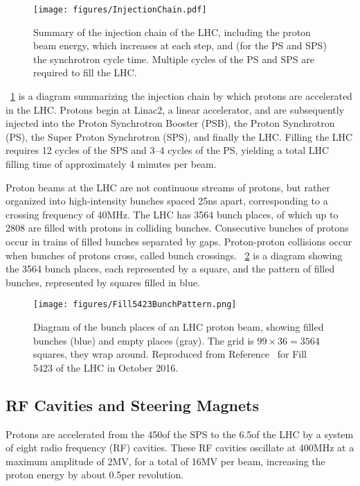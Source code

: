 \begin{figure}[tpb]
  \centering
  \texttt{[image: figures/InjectionChain.pdf]}
  \caption{Summary of the injection chain of the LHC, including the proton beam energy, which increases at each step, and (for the PS and SPS) the synchrotron cycle time. Multiple cycles of the PS and SPS are required to fill the LHC.}
  \label{cms:injectionchain}
\end{figure}

\Fig~\ref{cms:injectionchain} is a diagram summarizing the injection chain by which protons are accelerated in the LHC.
Protons begin at Linac2, a linear accelerator, and are subsequently injected into the Proton Synchrotron Booster (PSB), the Proton Synchrotron (PS), the Super Proton Synchrotron (SPS), and finally the LHC.
Filling the LHC requires 12 cycles of the SPS and 3--4 cycles of the PS, yielding a total LHC filling time of approximately 4 minutes per beam.

Proton beams at the LHC are not continuous streams of protons, but rather organized into high-intensity bunches spaced 25\unit{ns} apart, corresponding to a crossing frequency of 40\unit{MHz}.
The LHC has 3564 bunch places, of which up to 2808 are filled with protons in colliding bunches.
Consecutive bunches of protons occur in trains of filled bunches separated by gaps.
Proton-proton collisions occur when bunches of protons cross, called bunch crossings.
\Fig~\ref{cms:lhcbunchpattern} is a diagram showing the 3564 bunch places, each represented by a square, and the pattern of filled bunches, represented by squares filled in blue.

\begin{figure}[tpb]
  \centering
  \texttt{[image: figures/Fill5423BunchPattern.png]}
  \caption{Diagram of the bunch places of an LHC proton beam, showing filled bunches (blue) and empty places (gray). The grid is $99 \times 36 = 3564$ squares, \ie they wrap around. Reproduced from Reference~\cite{CMSWBM:Fill5423} for Fill 5423 of the LHC in October 2016.}
  \label{cms:lhcbunchpattern}
\end{figure}

\subsection{RF Cavities and Steering Magnets}
Protons are accelerated from the 450\GeV of the SPS to the 6.5\TeV of the LHC by a system of eight radio frequency (RF) cavities.
These RF cavities oscillate at 400\unit{MHz} at a maximum amplitude of 2\unit{MV}, for a total of 16\unit{MV} per beam, increasing the proton energy by about 0.5\MeV per revolution.

